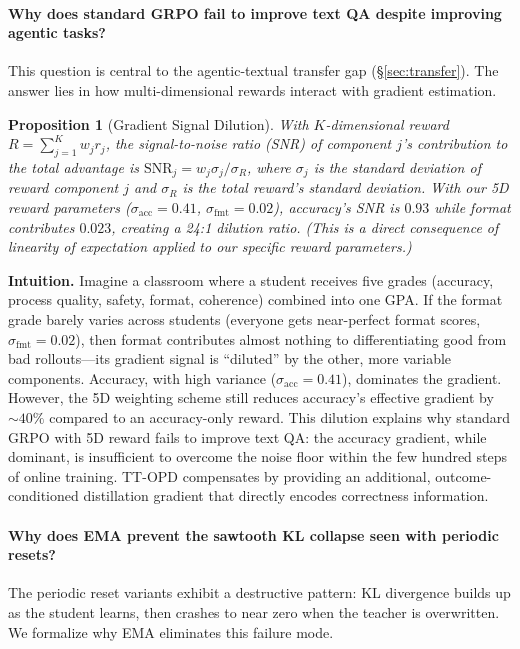 \documentclass{article}
\newtheorem{proposition}{Proposition}[section]
\begin{document}
\paragraph{Why does standard GRPO fail to improve text QA despite improving agentic tasks?}
This question is central to the agentic-textual transfer gap (\S\ref{sec:transfer}). The answer lies in how multi-dimensional rewards interact with gradient estimation.

\begin{proposition}[Gradient Signal Dilution]
\label{prop:dilution}
With $K$-dimensional reward $R = \sum_{j=1}^K w_j r_j$, the signal-to-noise ratio (SNR) of component $j$'s contribution to the total advantage is $\mathrm{SNR}_j = w_j\sigma_j / \sigma_R$, where $\sigma_j$ is the standard deviation of reward component $j$ and $\sigma_R$ is the total reward's standard deviation. With our 5D reward parameters ($\sigma_\mathrm{acc}{=}0.41$, $\sigma_\mathrm{fmt}{=}0.02$), accuracy's SNR is $0.93$ while format contributes $0.023$, creating a 24:1 dilution ratio. (This is a direct consequence of linearity of expectation applied to our specific reward parameters.)
\end{proposition}

\noindent\textbf{Intuition.} Imagine a classroom where a student receives five grades (accuracy, process quality, safety, format, coherence) combined into one GPA. If the format grade barely varies across students (everyone gets near-perfect format scores, $\sigma_\mathrm{fmt}{=}0.02$), then format contributes almost nothing to differentiating good from bad rollouts---its gradient signal is ``diluted'' by the other, more variable components. Accuracy, with high variance ($\sigma_\mathrm{acc}{=}0.41$), dominates the gradient. However, the 5D weighting scheme still reduces accuracy's effective gradient by ${\sim}40\%$ compared to an accuracy-only reward. This dilution explains why standard GRPO with 5D reward fails to improve text QA: the accuracy gradient, while dominant, is insufficient to overcome the noise floor within the few hundred steps of online training. TT-OPD compensates by providing an additional, outcome-conditioned distillation gradient that directly encodes correctness information.

\paragraph{Why does EMA prevent the sawtooth KL collapse seen with periodic resets?}
The periodic reset variants exhibit a destructive pattern: KL divergence builds up as the student learns, then crashes to near zero when the teacher is overwritten. We formalize why EMA eliminates this failure mode.
\end{document}
